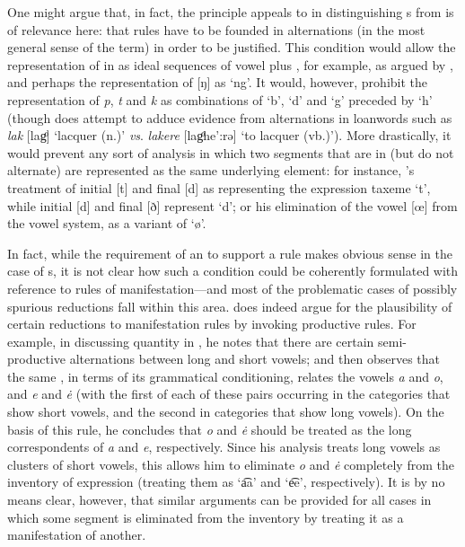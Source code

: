 One might argue that, in fact, the principle {\Hjelmslev} appeals to in
distinguishing s from  is of relevance
here: that {rules} have to be founded in alternations (in the most
general sense of the term) in order to be justified. This condition
would allow the representation of  in  as ideal
sequences of vowel plus , for example, as argued by
{\Hjelmslev}, and perhaps the representation of  {[ŋ]} as `ng'. It
would, however, prohibit the representation of  \emph{p},
\emph{t} and \emph{k} as combinations of `b', `d' and `g' preceded by
`h' (though {\Hjelmslev} does attempt to adduce evidence from
alternations in loanwords such as \emph{lak} {[lagͦ]} `lacquer (n.)'
\emph{vs}. \emph{lakere} {[lagͦhe':rə]} `to lacquer (vb.)'). More
drastically, it would prevent any sort of analysis in which two
segments that are in  (but do not alternate)
are represented as the same underlying element: for instance,
{\Hjelmslev}'s treatment of   initial {[t]} and final {[d]}
as representing the expression taxeme `t', while initial {[d]} and
final {[ð]} represent `d'; or his elimination of the vowel {[œ]} from
the  vowel system, as a variant of `ø'.

In fact, while the requirement of an  to support a rule
makes obvious sense in the case of s, it is not clear how
such a condition could be coherently formulated with reference to
{rules} of manifestation—and most of the problematic cases of possibly
spurious reductions fall within this area. {\Hjelmslev} does indeed argue
for the plausibility of certain reductions to manifestation {rules} by
invoking productive {rules}. For example, in discussing quantity in
, he notes that there are certain semi-productive
alternations between long and short vowels; and then observes that the
same , in terms of its grammatical conditioning, relates
the vowels \emph{a} and \emph{o}, and \emph{e} and \emph{ė} (with the
first of each of these pairs occurring in the categories that show
short vowels, and the second in categories that show long vowels). On
the basis of this rule, he concludes that \emph{o} and \emph{ė} should
be treated as the long correspondents of \emph{a} and \emph{e},
respectively. Since his analysis treats long vowels as clusters of
short vowels, this allows him to eliminate \emph{o} and \emph{ė} completely
from the inventory of  expression  (treating them as
`a͡a' and `e͡e', respectively). It is by no means clear, however, that
similar arguments can be provided for all cases in which some segment
is eliminated from the inventory by treating it as a manifestation of
another.

